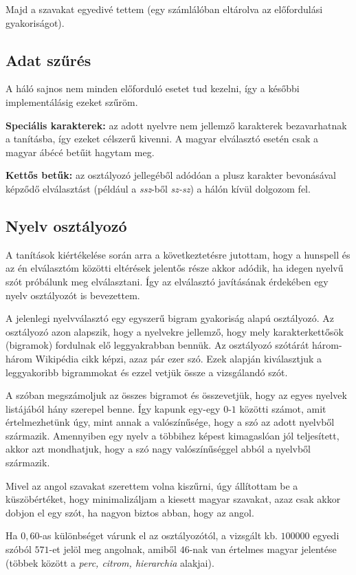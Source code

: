 \documentclass[a4paper, magyar]{article}
\begin{document}
Majd a szavakat egyedivé tettem (egy számlálóban eltárolva az előfordulási gyakoriságot).
\subsection{Adat szűrés}
A háló sajnos nem minden előforduló esetet tud kezelni, így a későbbi implementálásig ezeket szűröm.

\textbf{Speciális karakterek:} az adott nyelvre nem jellemző karakterek bezavarhatnak a tanításba, így ezeket célszerű kivenni. A magyar elválasztó esetén csak a magyar ábécé betűit hagytam meg.

\textbf{Kettős betűk:} az osztályozó jellegéből adódóan a plusz karakter bevonásával képződő elválasztást (például a \textit{ssz}-ből \textit{sz-sz}) a hálón kívül dolgozom fel.
\subsection{Nyelv osztályozó}
A tanítások kiértékelése során arra a következtetésre jutottam, hogy a hunspell és az én elválasztóm közötti eltérések jelentős része akkor adódik, ha idegen nyelvű szót próbálunk meg elválasztani. Így az elválasztó javításának érdekében egy nyelv osztályozót is bevezettem.

A jelenlegi nyelvválasztó egy egyszerű bigram gyakoriság alapú osztályozó.
Az osztályozó azon alapszik, hogy a nyelvekre jellemző, hogy mely karakterkettősök (bigramok) fordulnak elő leggyakrabban bennük. Az osztályozó szótárát három-három Wikipédia cikk képzi, azaz pár ezer szó. Ezek alapján kiválasztjuk a leggyakoribb bigrammokat és ezzel vetjük össze a vizsgálandó szót.

A szóban megszámoljuk az összes bigramot és összevetjük, hogy az egyes nyelvek listájából hány szerepel benne. Így kapunk egy-egy $0$-$1$ közötti számot, amit értelmezhetünk úgy, mint annak a valószínűsége, hogy a szó az adott nyelvből származik. Amennyiben egy nyelv a többihez képest kimagaslóan jól teljesített, akkor azt mondhatjuk, hogy a szó nagy valószínűséggel abból a nyelvből származik.

Mivel az angol szavakat szerettem volna kiszűrni, úgy állítottam be a küszöbértéket, hogy minimalizáljam a kiesett magyar szavakat, azaz csak akkor dobjon el egy szót, ha nagyon biztos abban, hogy az angol.

Ha $0,60$-as különbséget várunk el az osztályozótól, a vizsgált kb. $100 000$ egyedi szóból $571$-et jelöl meg angolnak, amiből $46$-nak van értelmes magyar jelentése (többek között a \textit{perc, citrom, hierarchia} alakjai).
\end{document}
